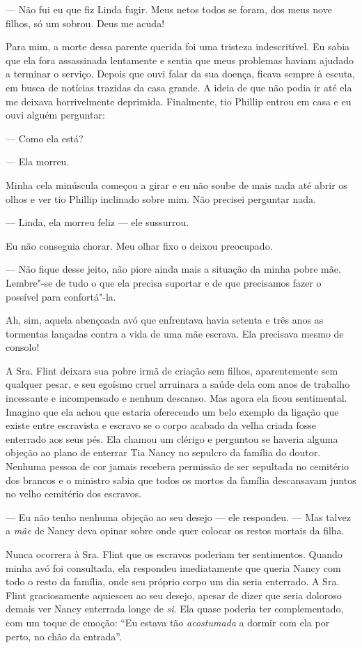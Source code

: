 --- Não fui eu que fiz Linda fugir. Meus netos todos se foram, dos meus
nove filhos, só um sobrou. Deus me acuda!

Para mim, a morte dessa parente querida
foi uma tristeza indescritível. Eu sabia que ela fora assassinada
lentamente e sentia que meus problemas haviam ajudado a terminar o
serviço. Depois que ouvi falar da sua doença, ficava sempre à escuta, em
busca de notícias trazidas da casa grande. A ideia de que não podia ir
até ela me deixava horrivelmente deprimida. Finalmente, tio Phillip
entrou em casa e eu ouvi alguém perguntar:

--- Como ela está?

--- Ela morreu.

Minha cela minúscula começou a girar e eu não soube de mais nada até
abrir os olhos e ver tio Phillip inclinado sobre mim. Não precisei
perguntar nada.

--- Linda, ela morreu feliz --- ele sussurrou.

Eu não conseguia chorar. Meu olhar fixo o deixou preocupado.

--- Não fique desse jeito, não piore ainda mais a situação da minha
pobre mãe. Lembre"-se de tudo o que ela precisa suportar e de que
precisamos fazer o possível para confortá"-la.

Ah, sim, aquela abençoada avó que enfrentava havia setenta e três anos
as tormentas lançadas contra a vida de uma mãe escrava. Ela precisava
mesmo de consolo!

A Sra. Flint deixara sua pobre irmã de
criação sem filhos, aparentemente sem qualquer pesar, e seu egoísmo
cruel arruinara a saúde dela com anos de trabalho incessante e
incompensado e nenhum descanso. Mas agora ela ficou sentimental. Imagino
que ela achou que estaria oferecendo um belo exemplo da ligação que
existe entre escravista e escravo se o corpo acabado da velha criada
fosse enterrado aos seus pés. Ela chamou um clérigo e perguntou se
haveria alguma objeção ao plano de enterrar Tia Nancy no sepulcro da
família do doutor. Nenhuma pessoa de cor jamais recebera permissão de
ser sepultada no cemitério dos brancos e o ministro sabia que todos os
mortos da família descansavam juntos no velho cemitério dos escravos.

--- Eu não tenho nenhuma objeção ao seu desejo --- ele respondeu. ---
Mas talvez a \emph{mãe} de Nancy deva opinar sobre onde quer colocar os
restos mortais da filha.

Nunca ocorrera à Sra. Flint que os
escravos poderiam ter sentimentos. Quando minha avó foi consultada, ela
respondeu imediatamente que queria Nancy com todo o resto da família,
onde seu próprio corpo um dia seria enterrado. A Sra. Flint
graciosamente aquiesceu ao seu desejo, apesar de dizer que seria
doloroso demais ver Nancy enterrada longe de \emph{si}. Ela quase
poderia ter complementado, com um toque de emoção: ``Eu estava tão
\emph{acostumada} a dormir com ela por perto, no chão da entrada''.

